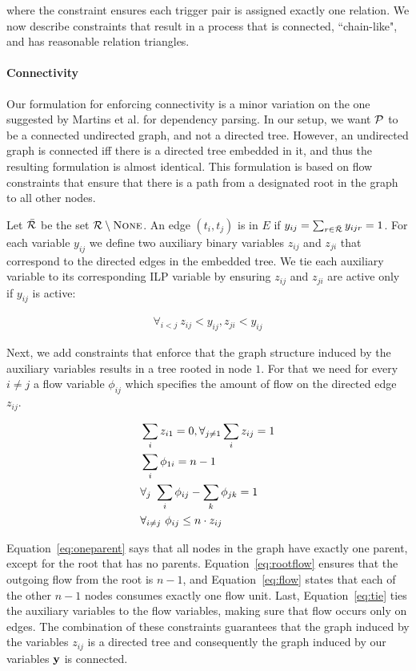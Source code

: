 \noindent where the constraint ensures each trigger pair is assigned exactly one relation. We now describe constraints that result in a process that is connected, ``chain-like", and has reasonable relation triangles.

\paragraph{Connectivity} 
Our formulation for enforcing connectivity is a minor variation on the one suggested by Martins et al.  for dependency parsing. In our setup, we want $\mathcal{P}$ to be a connected undirected graph, and not a directed tree. However, an undirected graph is connected iff there is a directed tree embedded in it, and thus the resulting formulation is almost identical. This formulation is based on flow constraints that ensure that there is a path from a designated root in the graph to all other nodes.

 Let $\bar{\mathcal{R}}$ be the set $\mathcal{R} \setminus \mbox{\textsc{None}}$. An edge $(t_i,t_j)$ is in $E$ if $y_{ij}=\sum_{r \in \bar{\mathcal{R}}} y_{ijr}=1$. For each variable $y_{ij}$ we define two auxiliary binary variables $z_{ij}$ and $z_{ji}$ that correspond to the directed edges in the embedded tree. We tie each auxiliary variable to its corresponding ILP variable by ensuring  $z_{ij}$ and $z_{ji}$ are active only if $y_{ij}$ is active:
 
\begin{align}
\forall_{i<j} \ z_{ij}<y_{ij}, z_{ji} < y_{ij}
\end{align}

Next, we add constraints that enforce that the graph structure induced by the auxiliary variables results in a tree rooted in node $1$. For that we need for every $i \neq j$ a flow variable $\phi_{ij}$ which specifies the amount of flow on the directed edge $z_{ij}$.

\begin{align}
\small &\sum_{i} z_{i1} =0, \forall_{j \neq 1} \sum_{i} z_{ij}=1 \label{eq:oneparent} \\ 
&\sum_{i} \phi_{1i}=n-1 \label{eq:rootflow} \\ 
&\forall_{j} \ \sum_{i} \phi_{ij} - \sum_{k} \phi_{jk}=1 \label{eq:flow} \\
&\forall_{i \neq j} \ \phi_{ij} \leq n \cdot z_{ij} \label{eq:tie} 
\end{align}

Equation~\ref{eq:oneparent} says that all nodes in the graph have exactly one parent, except for the root that has no parents. Equation~\ref{eq:rootflow} ensures that the outgoing flow from the root is $n-1$, and Equation~\ref{eq:flow} states that each of the other $n-1$ nodes consumes exactly one flow unit. Last, Equation~\ref{eq:tie} ties the auxiliary variables to the flow variables, making sure that flow occurs only on edges. The combination of these constraints guarantees that the graph induced by the variables $z_{ij}$ is a directed tree and consequently the graph induced by our variables $\mathbf{y}$ is connected.


